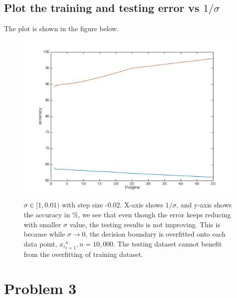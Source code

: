 \documentclass[twoside]{article}
\theoremstyle{definition}
\theoremstyle{definition}
\theoremstyle{remark}
\newcommand{\percent}{$\%$}
\begin{document}
\subsection{Plot the training and testing error vs $1/\sigma$}
The plot is shown in the figure below.
\begin{figure}[H]
\centering
\includegraphics[width=120mm]{training_testing_err.jpg}
\caption{ $\sigma \in [1,0.01)$ with step size -0.02. X-axis shows $1/\sigma$, and y-axis shows the accuracy in \percent, we see that even though the error keeps reducing with smaller $\sigma$ value, the testing results is not improving. This is because while $\sigma \rightarrow 0$, the decision boundary is overfitted onto each data point, ${x_i}_{i=1}^n, n = 10,000$. The testing dataset cannot benefit from the overfitting of training dataset.} 
\end{figure}

\section{Problem 3}
\end{document}
